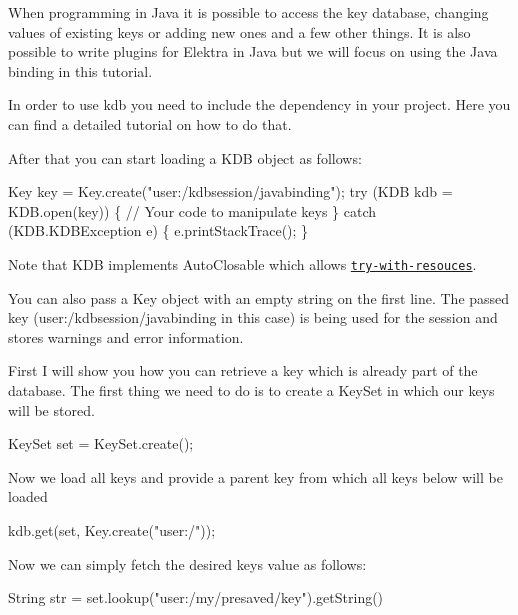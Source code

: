 When programming in Java it is possible to access the key database, changing values of existing keys or adding new ones and a few other things. It is also possible to write plugins for Elektra in Java but we will focus on using the Java binding in this tutorial.

In order to use {\ttfamily kdb} you need to include the dependency in your project. Here you can find a detailed tutorial on how to do that.

After that you can start loading a {\ttfamily K\+DB} object as follows\+:


\begin{DoxyCode}
Key key = Key.create(\textcolor{stringliteral}{"user:/kdbsession/javabinding"});
\textcolor{keywordflow}{try} (KDB kdb = KDB.open(key)) \{
    \textcolor{comment}{// Your code to manipulate keys}
\} \textcolor{keywordflow}{catch} (KDB.KDBException e) \{
    e.printStackTrace();
\}
\end{DoxyCode}


Note that {\ttfamily K\+DB} implements {\ttfamily Auto\+Closable} which allows \href{https://docs.oracle.com/javase/tutorial/essential/exceptions/tryResourceClose.html}{\tt try-\/with-\/resouces}.

You can also pass a {\ttfamily Key} object with an empty string on the first line. The passed key ({\ttfamily user\+:/kdbsession/javabinding} in this case) is being used for the session and stores warnings and error information.

First I will show you how you can retrieve a key which is already part of the database. The first thing we need to do is to create a {\ttfamily Key\+Set} in which our keys will be stored.


\begin{DoxyCode}
KeySet \textcolor{keyword}{set} = KeySet.create();
\end{DoxyCode}


Now we load all keys and provide a parent key from which all keys below will be loaded


\begin{DoxyCode}
kdb.get(\textcolor{keyword}{set}, Key.create(\textcolor{stringliteral}{"user:/"}));
\end{DoxyCode}


Now we can simply fetch the desired key\textquotesingle{}s value as follows\+:


\begin{DoxyCode}
String str = \textcolor{keyword}{set}.lookup(\textcolor{stringliteral}{"user:/my/presaved/key"}).getString()
\end{DoxyCode}


